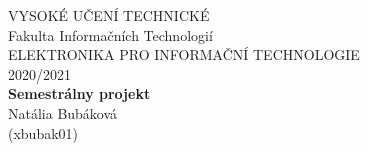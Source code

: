 \documentclass[slovak]{fitiel}
\title{\logo}
\author{} %
\date{\today}
\begin{document}
    \begin{titlepage}
        \centering
        {\Huge\textmd VYSOKÉ UČENÍ TECHNICKÉ\\}
        \vspace{1cm}
        {\huge Fakulta Informačních Technologií\\}
        \vspace{6cm}
        {\LARGE ELEKTRONIKA PRO INFORMAČNÍ TECHNOLOGIE\\}
        \vspace{0.5cm}
        {\LARGE 2020/2021\\}
        \vspace{3cm}
        {\huge\bfseries Semestrálny projekt\\}
        \vspace{7.5cm}
        \flushright
        {\Large Natália Bubáková\\}
        \vspace{0,5cm}
        {\Large (xbubak01)}
    \end{titlepage}

	\maketitle
	\vspace{3cm}
	\tableofcontents
	\newpage
	
	 \newpage
	 \newpage
	 \newpage
	 \newpage
	 \newpage
	
	
	
\end{document}
